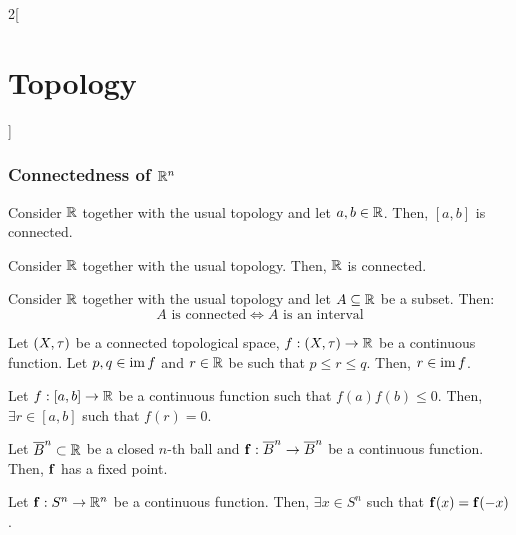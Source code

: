 \documentclass[../../../main.tex]{subfiles}
\begin{document}
\begin{multicols}{2}[\section{Topology}]
  \subsubsection{Connectedness of \texorpdfstring{$\mathbb{R}^n$}{Rn}}
  \begin{theorem}
    Consider $\mathbb{R}$ together with the usual topology and let $a,b\in\mathbb{R}$. Then, $[a,b]$ is connected.
  \end{theorem}
  \begin{theorem}
    Consider $\mathbb{R}$ together with the usual topology. Then, $\mathbb{R}$ is connected.
  \end{theorem}
  \begin{theorem}
    Consider $\mathbb{R}$ together with the usual topology and let $A\subseteq \mathbb{R}$ be a subset. Then: $$A\text{ is connected}\iff A\text{ is an interval}$$
  \end{theorem}
  \begin{theorem}
    Let $(X,\tau)$ be a connected topological space, $f:(X,\tau)\rightarrow\mathbb{R}$ be a continuous function. Let $p,q\in \operatorname{im} f$ and $r\in \mathbb{R}$ be such that $p\leq r\leq q$. Then, $r\in \operatorname{im} f$.
  \end{theorem}
  \begin{corollary}
    Let $f:[a,b]\rightarrow\mathbb{R}$ be a continuous function such that $f(a)f(b)\leq 0$. Then, $\exists r\in [a,b]$ such that $f(r)=0$.
  \end{corollary}
  \begin{theorem}
    Let $\overline{B}^n\subset\mathbb{R}$ be a closed $n$-th ball and $\boldsymbol{\mathrm{f}}:\overline{B}^n\rightarrow\overline{B}^n$ be a continuous function. Then, $\boldsymbol{\mathrm{f}}$ has a fixed point.
  \end{theorem}
  \begin{theorem}
    Let $\boldsymbol{\mathrm{f}}:S^n\rightarrow\mathbb{R}^n$ be a continuous function. Then, $\exists x\in S^n$ such that $\boldsymbol{\mathrm{f}}(x)=\boldsymbol{\mathrm{f}}(-x)$.
  \end{theorem}

\end{multicols}
\end{document}
